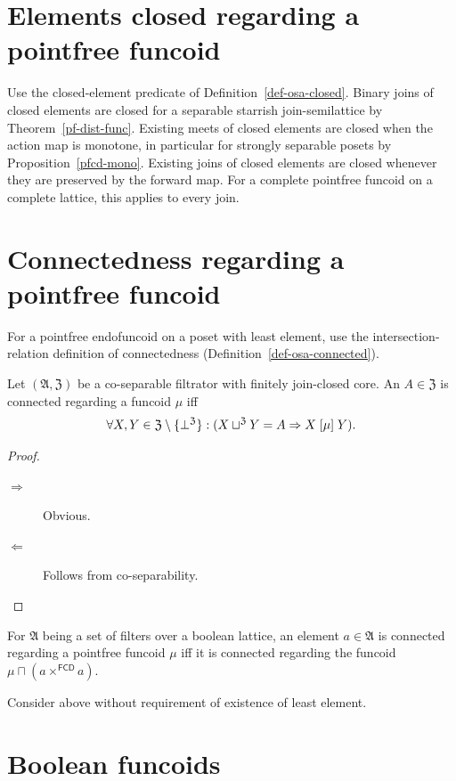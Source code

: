 \section{Elements closed regarding a pointfree funcoid}

Use the closed-element predicate of Definition~\ref{def-osa-closed}.
Binary joins of closed elements are closed for a separable starrish
join-semilattice by Theorem~\ref{pf-dist-func}. Existing meets of
closed elements are closed when the action map is monotone, in
particular for strongly separable posets by Proposition~\ref{pfcd-mono}.
Existing joins of closed elements are closed whenever they are
preserved by the forward map. For a complete pointfree funcoid on a
complete lattice, this applies to every join.

\section{Connectedness regarding a pointfree funcoid}

For a pointfree endofuncoid on a poset with least element,
use the intersection-relation definition of connectedness
(Definition~\ref{def-osa-connected}).

\begin{prop}
Let $(\mathfrak{A},\mathfrak{Z})$ be a co-separable filtrator with
finitely join-closed core. An $A\in\mathfrak{Z}$ is connected regarding a
funcoid $\mu$ iff 
\[
\forall X,Y\in\mathfrak{Z}\setminus\{\bot^{\mathfrak{Z}}\}:(X\sqcup^{\mathfrak{Z}}Y=A\Rightarrow X\mathrel{\left[\mu\right]}Y).
\]
\end{prop}
\begin{proof}
~
\begin{description}
\item [{$\Rightarrow$}] Obvious.
\item [{$\Leftarrow$}] Follows from co-separability.
\end{description}
\end{proof}
\begin{obvious}
For $\mathfrak{A}$ being a set of filters over a boolean lattice,
an element $a\in\mathfrak{A}$ is connected regarding a pointfree
funcoid $\mu$ iff it is connected regarding the funcoid $\mu\sqcap(a\times^{\mathsf{FCD}}a)$.\end{obvious}
\begin{xca}
Consider above without requirement of existence of least element.
\end{xca}

\section{Boolean funcoids}

